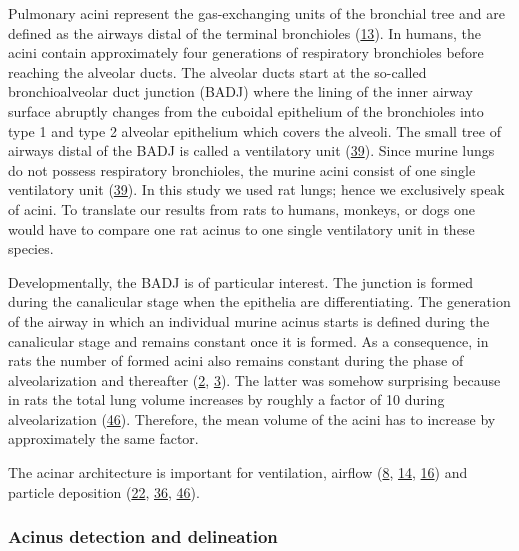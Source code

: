 \documentclass[
  american,
]{article}
\begin{document}
Pulmonary acini represent the gas-exchanging units of the bronchial tree and are defined as the airways distal of the terminal bronchioles (\protect\hyperlink{ref-BbEFwEVD}{13}).
In humans, the acini contain approximately four generations of respiratory bronchioles before reaching the alveolar ducts.
The alveolar ducts start at the so-called bronchioalveolar duct junction (BADJ) where the lining of the inner airway surface abruptly changes from the cuboidal epithelium of the bronchioles into type 1 and type 2 alveolar epithelium which covers the alveoli.
The small tree of airways distal of the BADJ is called a ventilatory unit (\protect\hyperlink{ref-WDrIHn9p}{39}).
Since murine lungs do not possess respiratory bronchioles, the murine acini consist of one single ventilatory unit (\protect\hyperlink{ref-WDrIHn9p}{39}).
In this study we used rat lungs; hence we exclusively speak of acini.
To translate our results from rats to humans, monkeys, or dogs one would have to compare one rat acinus to one single ventilatory unit in these species.

Developmentally, the BADJ is of particular interest.
The junction is formed during the canalicular stage when the epithelia are differentiating.
The generation of the airway in which an individual murine acinus starts is defined during the canalicular stage and remains constant once it is formed.
As a consequence, in rats the number of formed acini also remains constant during the phase of alveolarization and thereafter (\protect\hyperlink{ref-14OP85b2F}{2}, \protect\hyperlink{ref-uFNlWogb}{3}).
The latter was somehow surprising because in rats the total lung volume increases by roughly a factor of 10 during alveolarization (\protect\hyperlink{ref-wnl86DEM}{46}).
Therefore, the mean volume of the acini has to increase by approximately the same factor.

The acinar architecture is important for ventilation, airflow (\protect\hyperlink{ref-CVl41LwO}{8}, \protect\hyperlink{ref-eb0gk6VO}{14}, \protect\hyperlink{ref-1DP2FRUSZ}{16}) and particle deposition (\protect\hyperlink{ref-18DcNLAv6}{22}, \protect\hyperlink{ref-yHHhvOtP}{36}, \protect\hyperlink{ref-wnl86DEM}{46}).

\hypertarget{acinus-detection-and-delineation}{%
\subsubsection{Acinus detection and delineation}\label{acinus-detection-and-delineation}}
\end{document}
